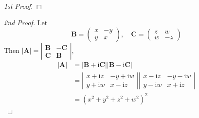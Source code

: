 \documentclass[12pt, a4paper, oneside]{book}
\begin{document}
\begin{question}
\begin{proof}[1st Proof]
    \end{proof}
    \begin{proof}[2nd Proof]
        Let
        \[
            \mathbf{B}=\left(\begin{array}{cc}
                    x & -y \\
                    y & x
                \end{array}\right), \quad \mathbf{C}=\left(\begin{array}{cc}
                    z & w  \\
                    w & -z
                \end{array}\right)
        \]
        Then $|\mathbf{A}|=\left|\begin{array}{cc}\mathbf{B} & -\mathbf{C} \\ \mathbf{C} & \mathbf{B}\end{array}\right|$,
        \[
            \begin{aligned}
                |\mathbf{A}| & =|\mathbf{B}+\mathrm{i} \mathbf{C}||\mathbf{B}-\mathrm{i} \mathbf{C}| \\
                             & =\left|\begin{array}{cc}
                                          x+\mathrm{i} z & -y+\mathrm{i} w \\
                                          y+\mathrm{i} w & x-\mathrm{i} z
                                      \end{array}\right|\left|\begin{array}{cc}
                                                                  x-\mathrm{i} z & -y-\mathrm{i} w \\
                                                                  y-\mathrm{i} w & x+\mathrm{i} z
                                                              \end{array}\right|       \\
                             & =\left(x^2+y^2+z^2+w^2\right)^2
            \end{aligned}
        \]
    \end{proof}
\end{question}
\end{document}
